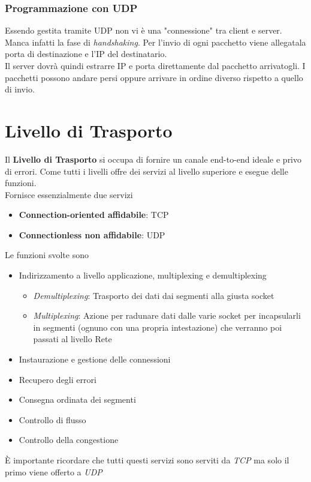 \documentclass{article}
\begin{document}
            \subsubsection{Programmazione con UDP}
                Essendo gestita tramite UDP non vi è una "connessione" tra client e server. Manca infatti la fase di \textit{handshaking}. Per l'invio di ogni pacchetto viene allegatala porta di destinazione e l'IP del destinatario.\\
                Il server dovrà quindi estrarre IP e porta direttamente dal pacchetto arrivatogli. I pacchetti possono andare persi oppure arrivare in ordine diverso rispetto a quello di invio. 

\newpage                
    \section{Livello di Trasporto}
        Il \textbf{Livello di Trasporto} si occupa di fornire un canale end-to-end ideale e privo di errori. Come tutti i livelli offre dei servizi al livello superiore e esegue delle funzioni.\\
        Fornisce essenzialmente due servizi
        \begin{itemize}
            \item \textbf{Connection-oriented affidabile}: TCP
            \item \textbf{Connectionless non affidabile}: UDP
        \end{itemize}
        Le funzioni svolte sono
        \begin{itemize}
            \item Indirizzamento a livello applicazione, multiplexing e demultiplexing
                  \begin{itemize}
                      \item \textit{Demultiplexing}: Trasporto dei dati dai segmenti alla giusta socket
                      \item \textit{Multiplexing}: Azione per radunare dati dalle varie socket per incapsularli in segmenti (ognuno con una propria intestazione) che verranno poi passati al livello Rete 
                  \end{itemize}
            \item Instaurazione e gestione delle connessioni
            \item Recupero degli errori
            \item Consegna ordinata dei segmenti
            \item Controllo di flusso
            \item Controllo della congestione
        \end{itemize}
        È importante ricordare che tutti questi servizi sono serviti da \textit{TCP} ma solo il primo viene offerto a \textit{UDP}
\end{document}
